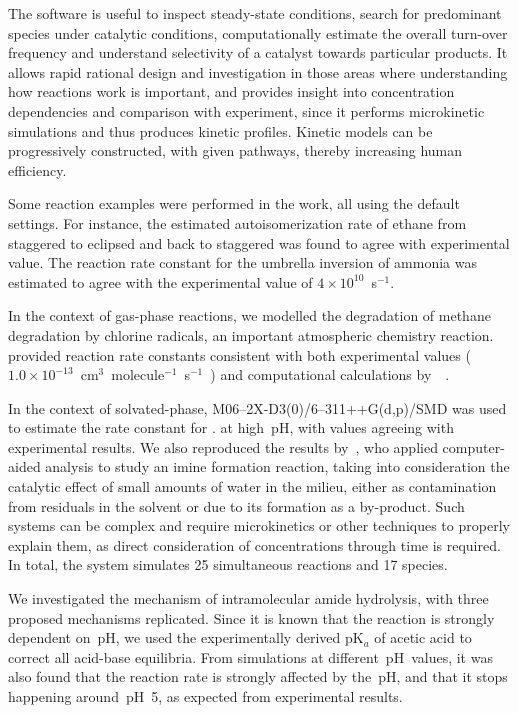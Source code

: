 The software is useful to inspect steady-state conditions,
search for predominant species under catalytic conditions,
computationally estimate the overall turn-over frequency and understand selectivity of a catalyst towards particular products.
It allows rapid rational design and investigation in those areas where understanding how reactions work is important,
and provides insight into concentration dependencies and comparison with experiment,
since it performs microkinetic simulations
and thus produces kinetic profiles.
Kinetic models can be progressively constructed,
with given pathways,
thereby increasing human efficiency.

Some reaction examples were performed in the work,
all using the default settings.
For instance,
the estimated autoisomerization rate of ethane from staggered to eclipsed
and back to staggered was found to agree with experimental value.
The reaction rate constant for the umbrella inversion of ammonia was estimated to agree
with the experimental value of $4 \times 10^{10}$~s$^{-1}$.

In the context of gas-phase reactions,
we modelled the degradation of methane degradation by chlorine radicals,
an important atmospheric chemistry reaction.
\overreact provided reaction rate constants consistent with both experimental values
($1.0 \times 10^{-13}$~cm$^3$~molecule$^{-1}$~s$^{-1}$~\cite{Burkholder_2020})
and computational calculations
by~\citeauthor{Tanaka_1996}~\cite{Tanaka_1996}.

In the context of solvated-phase,
M06--2X-D3(0)/6--311++G(d,p)/SMD was used to estimate the rate constant for .
at high~pH,
with values agreeing with experimental results.
We also reproduced the results by~\citeauthor{P_rez_Soto_2020},
who applied computer-aided analysis
to study an imine formation reaction,
taking into consideration the catalytic effect of small amounts of water in the milieu,
either as contamination from residuals in the solvent
or due to its formation as a by-product.
Such systems can be complex and require microkinetics or other techniques to properly explain them,
as direct consideration of concentrations through time is required.
In total,
the system simulates 25 simultaneous reactions and 17 species.

We investigated the mechanism of intramolecular amide hydrolysis,
with three proposed mechanisms replicated.
Since it is known that the reaction is strongly dependent on~pH,
we used the experimentally derived pK$_a$ of acetic acid to correct all acid-base equilibria.
From simulations at different~pH~values,
it was also found that the reaction rate is strongly affected by the~pH,
and that it stops happening around~pH~5,
as expected from experimental results.

